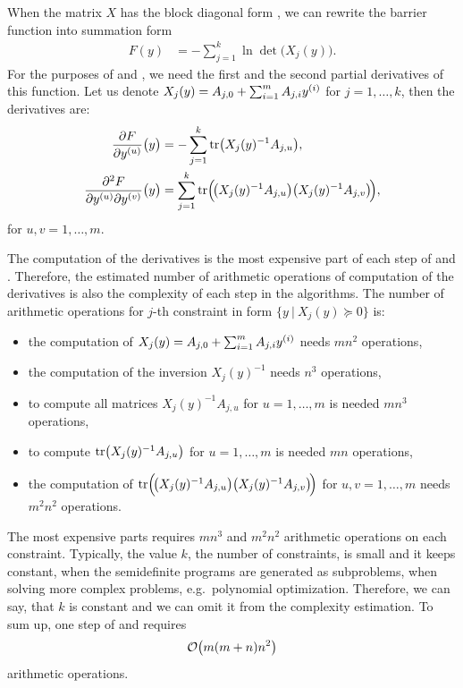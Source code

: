 When the matrix $X$ has the block diagonal form , we can rewrite the barrier function  into summation form
\begin{align}
  F(y) &= -\sum_{j=1}^k \ln\det\!\big(X_j(y)\big).
\end{align}
For the purposes of  and , we need the first and the second partial derivatives of this function.
Let us denote $X_j(y) = A_{j, 0} + \sum_{i=1}^mA_{j, i}y^{(i)}$ for $j = 1, \ldots, k$, then the derivatives are:
\begin{align}
  \frac{\partial F}{\partial y^{(u)}}\big(y\big) &= -\sum_{j=1}^k \operatorname{tr}\!\big(X_j(y)^{-1}A_{j,u}\big),\\
  \frac{\partial^2 F}{\partial y^{(u)} \partial y^{(v)}}\big(y\big) &= \sum_{j=1}^k \operatorname{tr}\!\Big(\!\big(X_j(y)^{-1}A_{j,u}\big)\big(X_j(y)^{-1}A_{j,v}\big)\!\Big),
\end{align}
for $u, v = 1,\ldots, m$.

The computation of the derivatives is the most expensive part of each step of  and .
Therefore, the estimated number of arithmetic operations of computation of the derivatives is also the complexity of each step in the algorithms.
The number of arithmetic operations for $j$-th constraint in form $\big\{y\ |\ X_j(y) \succeq 0\big\}$ is:
\begin{itemize}
  \item the computation of $X_j(y) = A_{j,0} + \sum_{i=1}^mA_{j,i}y^{(i)}$ needs $mn^2$ operations,
  \item the computation of the inversion $X_j(y)^{-1}$ needs $n^3$ operations,
  \item to compute all matrices $X_j(y)^{-1}A_{j,u}$ for $u = 1,\ldots,m$ is needed $mn^3$ operations,
  \item to compute $\operatorname{tr}\!\big(X_j(y)^{-1}A_{j,u}\big)$ for $u = 1,\ldots,m$ is needed $mn$ operations,
  \item the computation of $\operatorname{tr}\!\Big(\!\big(X_j(y)^{-1}A_{j,u}\big)\big(X_j(y)^{-1}A_{j,v}\big)\!\Big)$ for $u, v = 1,\ldots, m$ needs $m^2n^2$ operations.
\end{itemize}
The most expensive parts requires $mn^3$ and $m^2n^2$ arithmetic operations on each constraint.
Typically, the value $k$, the number of constraints, is small and it keeps constant, when the semidefinite programs are generated as subproblems, when solving more complex problems, e.g.\ polynomial optimization. Therefore, we can say, that $k$ is constant and we can omit it from the complexity estimation.
To sum up, one step of  and  requires
\begin{align}
  \mathcal{O}\big(m(m+n)n^2\big)\labeleq{SDP:bf:O}
\end{align}
arithmetic operations.

